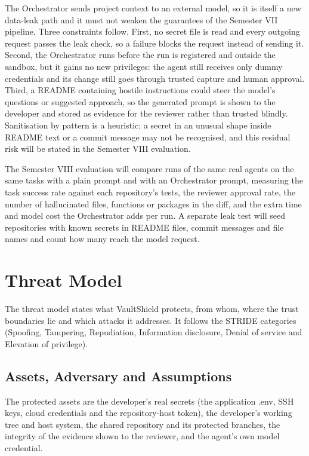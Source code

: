 \documentclass[12pt,a4paper,oneside]{report}
\begin{document}
The Orchestrator sends project context to an external model, so it is itself a new data-leak path and it must not weaken the guarantees of the Semester VII pipeline. Three constraints follow. First, no secret file is read and every outgoing request passes the leak check, so a failure blocks the request instead of sending it. Second, the Orchestrator runs before the run is registered and outside the sandbox, but it gains no new privileges: the agent still receives only dummy credentials and its change still goes through trusted capture and human approval. Third, a README containing hostile instructions could steer the model's questions or suggested approach, so the generated prompt is shown to the developer and stored as evidence for the reviewer rather than trusted blindly. Sanitisation by pattern is a heuristic; a secret in an unusual shape inside README text or a commit message may not be recognised, and this residual risk will be stated in the Semester VIII evaluation.

The Semester VIII evaluation will compare runs of the same real agents on the same tasks with a plain prompt and with an Orchestrator prompt, measuring the task success rate against each repository's tests, the reviewer approval rate, the number of hallucinated files, functions or packages in the diff, and the extra time and model cost the Orchestrator adds per run. A separate leak test will seed repositories with known secrets in README files, commit messages and file names and count how many reach the model request.

\section{Threat Model}\label{threat-model}

The threat model states what VaultShield protects, from whom, where the trust boundaries lie and which attacks it addresses. It follows the STRIDE categories (Spoofing, Tampering, Repudiation, Information disclosure, Denial of service and Elevation of privilege).

\subsection{Assets, Adversary and Assumptions}\label{threat-model-assets}

The protected assets are the developer's real secrets (the application .env, SSH keys, cloud credentials and the repository-host token), the developer's working tree and host system, the shared repository and its protected branches, the integrity of the evidence shown to the reviewer, and the agent's own model credential.
\end{document}
